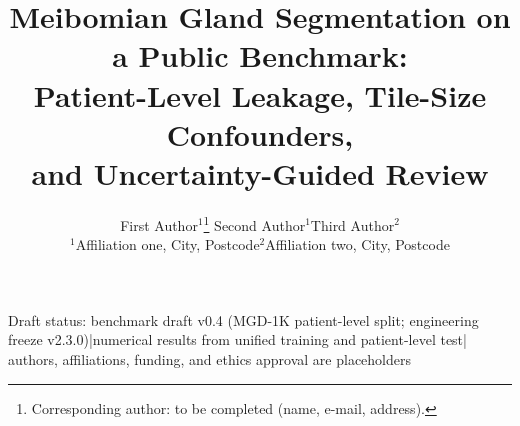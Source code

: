 \documentclass[11pt,a4paper]{article}
\title{\bfseries Meibomian Gland Segmentation on a Public Benchmark:\\[2pt]
Patient-Level Leakage, Tile-Size Confounders,\\[2pt]
and Uncertainty-Guided Review}
\author{First Author$^{1}$\thanks{Corresponding author: to be completed (name, e-mail, address).}\quad
Second Author$^{1}$\quad Third Author$^{2}$\\[4pt]
{\small $^{1}$Affiliation one, City, Postcode\quad $^{2}$Affiliation two, City, Postcode}}
\date{}
\begin{document}
\maketitle

\begin{center}
\footnotesize\color{gray}
Draft status: benchmark draft v0.4 (MGD-1K patient-level split; engineering freeze v2.3.0)\quad|\quad numerical results from unified training and patient-level test\quad|\quad
authors, affiliations, funding, and ethics approval are placeholders
\end{center}

\vspace{-0.6em}

\tableofcontents
\newpage















\appendix

\end{document}

